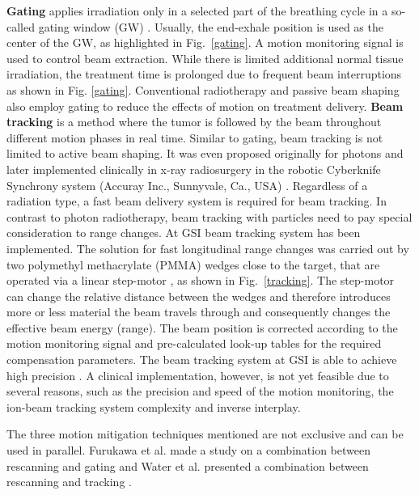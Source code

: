 \textbf{Gating} applies irradiation only in a selected part of the breathing cycle in a so-called gating window (GW) \cite{Minohara2000,Lu2006}. Usually, the end-exhale position is used as the center of the GW, as highlighted in Fig.~\ref{gating}.
A motion monitoring signal is used to control beam extraction. While there is limited additional normal tissue irradiation, the treatment time is prolonged due to frequent beam interruptions as shown in Fig. \ref{gating}.
Conventional radiotherapy and passive beam shaping also employ gating to reduce the effects of motion on treatment delivery.
\newline
\textbf{Beam tracking} is a method where the tumor is followed by the beam throughout different motion phases in real time. Similar to gating, beam tracking is not limited to active beam shaping. It was even proposed originally 
for photons \cite{Keall2001} and later implemented clinically in x-ray radiosurgery in the robotic Cyberknife Synchrony system (Accuray Inc., Sunnyvale, Ca., USA) \cite{Brown2007a,Kilby2010}. Regardless of a radiation type, a
fast beam delivery system is required for beam tracking. In contrast to photon radiotherapy, beam tracking with particles need to pay special consideration to range changes. At GSI beam tracking system has been implemented.
The solution for fast longitudinal range changes was carried out by two polymethyl methacrylate (PMMA) wedges close to the target, that are operated via a linear step-motor \cite{Saito2009}, as shown in Fig.~\ref{tracking}. The step-motor can
change the relative distance between the wedges and therefore introduces more or less material the beam travels through and consequently changes the effective beam energy (range). The beam position is corrected according to the motion monitoring
signal and pre-calculated look-up tables for the required compensation parameters. The beam tracking system at GSI is able to achieve high precision \cite{Bert2007, Bert2009, Saito2009}.
A clinical implementation, however, is not yet feasible due to several reasons, such as the precision and speed of the motion monitoring, the ion-beam tracking system complexity and inverse interplay.


The three motion mitigation techniques mentioned are not exclusive and can be used in parallel. Furukawa et al. made a study on a combination between rescanning and gating \cite{Furukawa2007} and Water et al. presented a combination
between rescanning and tracking \cite{Water2009}.

